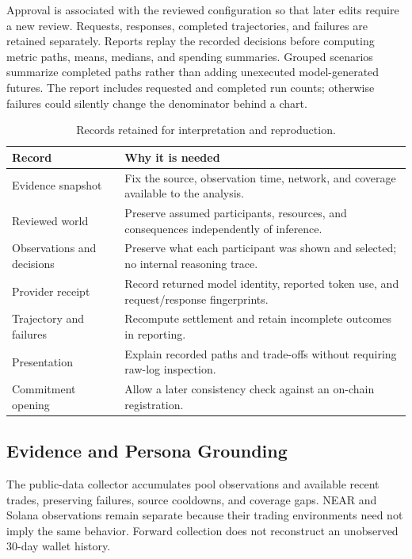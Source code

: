 Approval is associated with the reviewed configuration so that later edits
require a new review. Requests, responses, completed trajectories, and failures
are retained separately. Reports replay the recorded decisions before computing
metric paths, means, medians, and spending summaries. Grouped scenarios summarize
completed paths rather than adding unexecuted model-generated futures. The
report includes requested and completed run counts; otherwise failures could
silently change the denominator behind a chart.

\begin{table}[t]
\caption{Records retained for interpretation and reproduction.}
\label{tab:artifacts}
\centering\footnotesize
\begin{tabularx}{\columnwidth}{@{}p{}Y@{}}
\toprule Record & Why it is needed \\
\midrule
Evidence snapshot & Fix the source, observation time, network, and coverage available to the analysis. \\
Reviewed world & Preserve assumed participants, resources, and consequences independently of inference. \\
Observations and decisions & Preserve what each participant was shown and selected; no internal reasoning trace. \\
Provider receipt & Record returned model identity, reported token use, and request/response fingerprints. \\
Trajectory and failures & Recompute settlement and retain incomplete outcomes in reporting. \\
Presentation & Explain recorded paths and trade-offs without requiring raw-log inspection. \\
Commitment opening & Allow a later consistency check against an on-chain registration. \\
\bottomrule
\end{tabularx}
\end{table}

\subsection{Evidence and Persona Grounding}
The public-data collector accumulates pool observations and available recent
trades, preserving failures, source cooldowns, and coverage gaps. NEAR and
Solana observations remain separate because their trading environments need
not imply the same behavior. Forward collection does not reconstruct an
unobserved 30-day wallet history.


